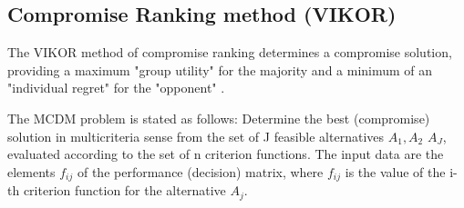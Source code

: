\subsection{Compromise Ranking method (VIKOR)}
The VIKOR method of compromise ranking determines a compromise solution, providing a maximum "group utility" for the majority and a minimum of an "individual regret" for the "opponent"\cite{VIKORformula} .

The MCDM problem is stated as follows: Determine the best (compromise) solution in multicriteria sense from the set of J feasible alternatives $A_{1}, A_{2}$ \textellipsis $A_{J}$, evaluated according to the set of n criterion functions. The input data are the elements $f_{ij}$ of the performance (decision) matrix, where $f_{ij}$ is the value of the i-th criterion function for the alternative $A_{j}$.

